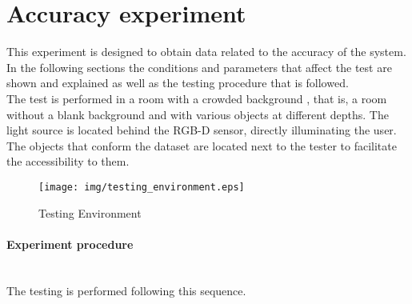 \newpage

\section{Accuracy experiment}

	This experiment is designed to obtain data related to the accuracy of the system. 
	\\

	In the following sections the conditions and parameters that affect the test are shown and explained as well as the testing procedure that is followed. \\[0.5cm]

		The test is performed in a room with a crowded background , that is, a room without a blank background and with various objects at different depths.
		The light source is located behind the RGB-D sensor, directly illuminating the user. 
		The objects that conform the dataset are located next to the tester to facilitate the accessibility to them. 
		\\%

	\begin{figure}[H]
		\begin{center}
	    \texttt{[image: img/testing\_environment.eps]}
		\caption[Testing Environment]{Testing Environment}
		\end{center}
	\end{figure}


	\paragraph{Experiment procedure}\mbox{}\\

		The testing is performed following this sequence. 


